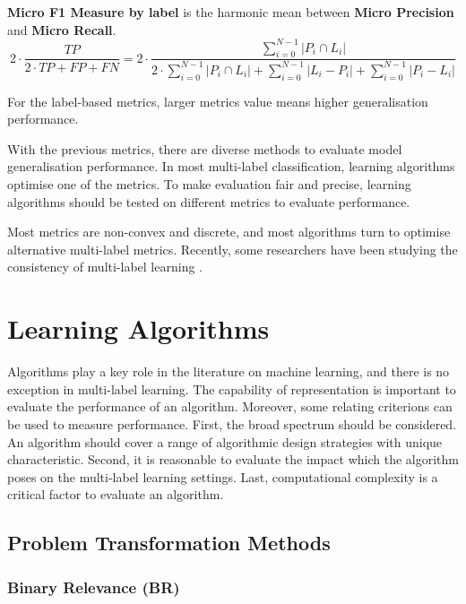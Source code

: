 \textbf{Micro F1 Measure by label} is the harmonic mean between \textbf{Micro Precision} and \textbf{Micro Recall}. 
\begin{equation}\label{eq:LabelMicroAccuracy}
2 \cdot \frac{TP}{2 \cdot TP + FP + FN}=2 \cdot \frac{\sum_{i=0}^{N-1} \left|P_i \cap L_i\right|}{2 \cdot
        \sum_{i=0}^{N-1} \left|P_i \cap L_i\right| + \sum_{i=0}^{N-1} \left|L_i - P_i\right| + \sum_{i=0}^{N-1}
        \left|P_i - L_i\right|}
\end{equation}

For the label-based metrics, larger metrics value means higher generalisation performance.

With the previous metrics, there are diverse methods to evaluate model generalisation performance. In most multi-label classification, learning algorithms optimise one of the metrics. To make evaluation fair and precise, learning algorithms should be tested on different metrics to evaluate performance.

Most metrics are non-convex and discrete, and most algorithms turn to optimise alternative multi-label metrics. Recently, some researchers have been studying the consistency of multi-label learning \citep{gao2013consistency}. 

\section{Learning Algorithms}

Algorithms play a key role in the literature on machine learning, and there is no exception in multi-label learning. The capability of representation is important to evaluate the performance of an algorithm. Moreover, some relating criterions can be used to measure performance. First, the broad spectrum should be considered. An algorithm should cover a range of algorithmic design strategies with unique characteristic. Second, it is reasonable to evaluate the impact which the algorithm poses on the multi-label learning settings. Last, computational complexity is a critical factor to evaluate an algorithm.

\subsection{Problem Transformation Methods}

\subsubsection{Binary Relevance (BR)}

